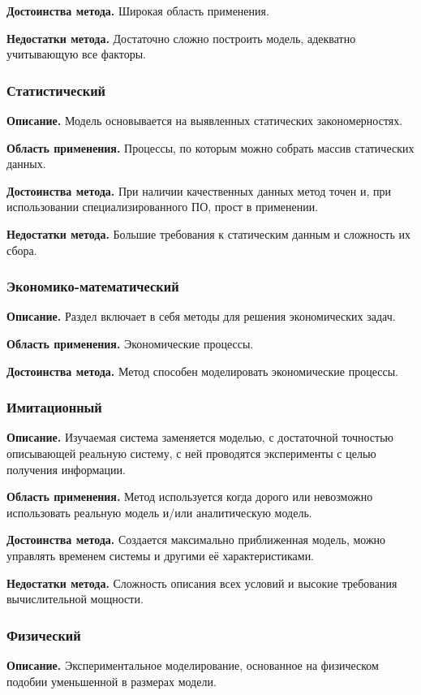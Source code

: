 \textbf{Достоинства метода.} Широкая область применения.

\textbf{Недостатки метода.} Достаточно сложно построить модель, адекватно учитывающую все факторы.

\subsubsection*{\textbf{Статистический}}
\textbf{Описание.} Модель основывается на выявленных статических закономерностях.

\textbf{Область применения.} Процессы, по которым можно собрать массив статических данных.

\textbf{Достоинства метода.} При наличии качественных данных метод точен и, при использовании специализированного ПО, прост в применении.

\textbf{Недостатки метода.} Большие требования к статическим данным и сложность их сбора.

\subsubsection*{\textbf{Экономико-математический}}
\textbf{Описание.} Раздел включает в себя методы для решения экономических задач.

\textbf{Область применения.} Экономические процессы.

\textbf{Достоинства метода.} Метод способен моделировать экономические процессы.

\subsubsection*{\textbf{Имитационный}}
\textbf{Описание.} Изучаемая система заменяется моделью, с достаточной точностью описывающей реальную систему, с ней проводятся эксперименты с целью получения информации.

\textbf{Область применения.} Метод используется когда дорого или невозможно использовать реальную модель и/или аналитическую модель.

\textbf{Достоинства метода.} Создается максимально приближенная модель, можно управлять временем системы и другими её характеристиками.

\textbf{Недостатки метода.} Сложность описания всех условий и высокие требования вычислительной мощности.

\subsubsection*{\textbf{Физический}}
\textbf{Описание.} Экспериментальное моделирование, основанное на физическом подобии уменьшенной в размерах модели.

